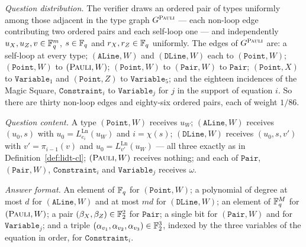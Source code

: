\begin{definition}
\emph{Question distribution.} The verifier draws an ordered pair of types uniformly among
those adjacent in the type graph $G^{\textsc{Pauli}}$ --- each non-loop edge contributing two ordered
pairs and each self-loop one --- and independently $u_X, u_Z, v \in \mathbb{F}_q^m$, $s \in \mathbb{F}_q$ and
$r_X, r_Z \in \mathbb{F}_q$ uniformly. The edges of $G^{\textsc{Pauli}}$ are: a self-loop at every type;
$(\mathtt{ALine}, W)$ and $(\mathtt{DLine}, W)$ each to $(\mathtt{Point}, W)$;
$(\mathtt{Point}, W)$ to $(\textsc{Pauli}, W)$; $(\mathtt{Point}, W)$ to $(\mathtt{Pair}, W)$ to
$\mathtt{Pair}$; $(\mathtt{Point}, X)$ to $\mathtt{Variable}_1$ and $(\mathtt{Point}, Z)$ to
$\mathtt{Variable}_5$; and the eighteen incidences of the Magic Square, $\mathtt{Constraint}_i$
to $\mathtt{Variable}_j$ for $j$ in the support of equation $i$. So there are thirty non-loop
edges and eighty-six ordered pairs, each of weight $1/86$.

\emph{Question content.} A type $(\mathtt{Point}, W)$ receives $u_W$; $(\mathtt{ALine}, W)$
receives $(u_0, s)$ with $u_0 = L^{\mathrm{Ln}}_{e_i}(u_W)$ and $i = \chi(s)$;
$(\mathtt{DLine}, W)$ receives $(u_0, s, v')$ with $v' = \pi_{i-1}(v)$ and
$u_0 = L^{\mathrm{Ln}}_{v'}(u_W)$ --- all three exactly as in Definition~\ref{def:lidt-cl};
$(\textsc{Pauli}, W)$ receives nothing; and each of $\mathtt{Pair}$, $(\mathtt{Pair}, W)$,
$\mathtt{Constraint}_i$ and $\mathtt{Variable}_j$ receives $\omega$.

\emph{Answer format.} An element of $\mathbb{F}_q$ for $(\mathtt{Point}, W)$; a polynomial of degree at
most $d$ for $(\mathtt{ALine}, W)$ and at most $md$ for $(\mathtt{DLine}, W)$; an element of
$\mathbb{F}_q^M$ for $(\textsc{Pauli}, W)$; a pair $(\beta_X, \beta_Z) \in \mathbb{F}_2^2$ for $\mathtt{Pair}$; a
single bit for $(\mathtt{Pair}, W)$ and for $\mathtt{Variable}_j$; and a triple
$(\alpha_{v_1}, \alpha_{v_2}, \alpha_{v_3}) \in \mathbb{F}_2^3$, indexed by the three variables of the
equation in order, for $\mathtt{Constraint}_i$.


\end{definition}
